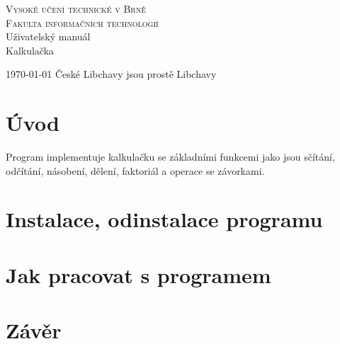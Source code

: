 \documentclass[11pt, a4paper, hidelinks]{article}
\begin{document}
\begin{titlepage}
        \begin{center}
            {\Huge\textsc{Vysoké učení technické v Brně \\[0.5em]}}
            {\huge\textsc{Fakulta informačních technologií}}\\
            {\Huge Uživatelský manuál\\[0.4em]}
            {\LARGE Kalkulačka}
        \end{center}
        {\Large \today}
        \hfill
        {\Large České Libchavy jsou prostě Libchavy}
\end{titlepage}
\restoregeometry

\tableofcontents
\newpage

\section{Úvod}
Program implementuje kalkulačku se základními funkcemi jako jsou sčítání, odčítání, násobení, dělení, faktoriál a operace se závorkami.

\section{Instalace, odinstalace programu}


\section{Jak pracovat s programem}

\section{Závěr}
\end{document}
